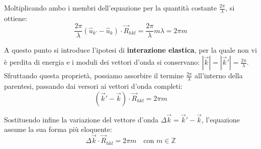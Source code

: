 Moltiplicando ambo i membri dell'equazione per la quantità costante \( \frac{2\pi}{\lambda} \), si ottiene:
\begin{equation}
    \frac{2\pi}{\lambda} (\hat{u}_{k'} - \hat{u}_{k}) \cdot \vec{R}_{hkl} = \frac{2\pi}{\lambda} m\lambda = 2\pi m
\end{equation}

A questo punto si introduce l'ipotesi di \textbf{interazione elastica}, per la quale non vi è perdita di energia e i moduli dei vettori d'onda si conservano: \( |\vec{k}| = |\vec{k}'| = \frac{2\pi}{\lambda} \). Sfruttando questa proprietà, possiamo assorbire il termine \( \frac{2\pi}{\lambda} \) all'interno della parentesi, passando dai versori ai vettori d'onda completi:
\begin{equation}
    (\vec{k}' - \vec{k}) \cdot \vec{R}_{hkl} = 2\pi m
\end{equation}

Sostituendo infine la variazione del vettore d'onda \( \Delta\vec{k} = \vec{k}' - \vec{k} \), l'equazione assume la sua forma più eloquente:
\begin{equation}
    \Delta\vec{k} \cdot \vec{R}_{hkl} = 2\pi m \quad \text{con } m \in \mathbb{Z}
\end{equation}

